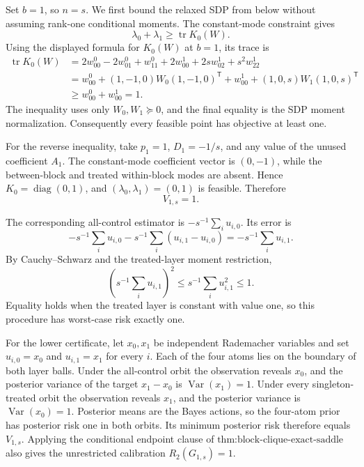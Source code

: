 Set \(b=1\), so \(n=s\). We first bound the relaxed SDP from below without assuming rank-one conditional moments. The constant-mode constraint gives
\[
\lambda_0+\lambda_1\ge\operatorname{tr}K_0(W).
\]
Using the displayed formula for \(K_0(W)\) at \(b=1\), its trace is
\[
\begin{aligned}
\operatorname{tr}K_0(W)
&=2w^0_{00}-2w^0_{01}+w^0_{11}
  +2w^1_{00}+2sw^1_{02}+s^2w^1_{22}\\
&=w^0_{00}+(1,-1,0)W_0(1,-1,0)^{\mathsf T}
  +w^1_{00}+(1,0,s)W_1(1,0,s)^{\mathsf T}\\
&\ge w^0_{00}+w^1_{00}=1.
\end{aligned}
\]
The inequality uses only \(W_0,W_1\succeq0\), and the final equality is the SDP moment normalization. Consequently every feasible point has objective at least one.

For the reverse inequality, take \(p_1=1\), \(D_1=-1/s\), and any value of the unused coefficient \(A_1\). The constant-mode coefficient vector is \((0,-1)\), while the between-block and treated within-block modes are absent. Hence \(K_0=\operatorname{diag}(0,1)\), and \((\lambda_0,\lambda_1)=(0,1)\) is feasible. Therefore
\[
V_{1,s}=1.
\]

The corresponding all-control estimator is \(-s^{-1}\sum_i u_{i,0}\). Its error is
\[
-s^{-1}\sum_i u_{i,0}
-s^{-1}\sum_i(u_{i,1}-u_{i,0})
=-s^{-1}\sum_i u_{i,1}.
\]
By Cauchy--Schwarz and the treated-layer moment restriction,
\[
\left(s^{-1}\sum_i u_{i,1}\right)^2
\le s^{-1}\sum_i u_{i,1}^2\le1.
\]
Equality holds when the treated layer is constant with value one, so this procedure has worst-case risk exactly one.

For the lower certificate, let \(x_0,x_1\) be independent Rademacher variables and set \(u_{i,0}=x_0\) and \(u_{i,1}=x_1\) for every \(i\). Each of the four atoms lies on the boundary of both layer balls. Under the all-control orbit the observation reveals \(x_0\), and the posterior variance of the target \(x_1-x_0\) is \(\operatorname{Var}(x_1)=1\). Under every singleton-treated orbit the observation reveals \(x_1\), and the posterior variance is \(\operatorname{Var}(x_0)=1\). Posterior means are the Bayes actions, so the four-atom prior has posterior risk one in both orbits. Its minimum posterior risk therefore equals \(V_{1,s}\). Applying the conditional endpoint clause of \(\text{thm:block-clique-exact-saddle}\) also gives the unrestricted calibration \(R_2(G_{1,s})=1\).